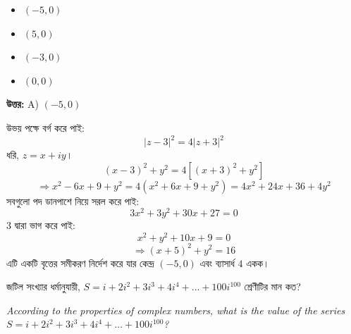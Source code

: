 \documentclass[12pt, a4paper]{article}
\begin{document}
\begin{itemize}[label={}, leftmargin=1cm, itemsep=0.5em]
    \item[\textbf{A)}] $(-5, 0)$
    \item[\textbf{B)}] $(5, 0)$
    \item[\textbf{C)}] $(-3, 0)$
    \item[\textbf{D)}] $(0, 0)$
\end{itemize}

\vspace{0.5em}
\begin{tcolorbox}[answerbox]
    \textbf{\color{success} উত্তর:} A) $(-5, 0)$
\end{tcolorbox}
\vspace{1em}

\begin{tcolorbox}[solutionbox={সমাধান (Solution)}]
    \noindent
    উভয় পক্ষে বর্গ করে পাই:
    \[ |z - 3|^2 = 4|z + 3|^2 \]
    ধরি, $z = x + iy$।
    \[ (x-3)^2 + y^2 = 4[(x+3)^2 + y^2] \]
    \[ \Rightarrow x^2 - 6x + 9 + y^2 = 4(x^2 + 6x + 9 + y^2) = 4x^2 + 24x + 36 + 4y^2 \]
    সবগুলো পদ ডানপাশে নিয়ে সরল করে পাই:
    \[ 3x^2 + 3y^2 + 30x + 27 = 0 \]
    $3$ দ্বারা ভাগ করে পাই:
    \[ x^2 + y^2 + 10x + 9 = 0 \]
    \[ \Rightarrow (x+5)^2 + y^2 = 16 \]
    এটি একটি বৃত্তের সমীকরণ নির্দেশ করে যার কেন্দ্র $(-5, 0)$ এবং ব্যাসার্ধ $4$ একক।
\end{tcolorbox}
\vspace{1em}

\begin{tcolorbox}[questionbox={প্রশ্ন (Question) 24}]
    \noindent
    জটিল সংখ্যার ধর্মানুযায়ী, $S = i + 2i^2 + 3i^3 + 4i^4 + \dots + 100i^{100}$ শ্রেণীটির মান কত?
    
    \vspace{0.8em}
    \begin{english}
    \noindent\textit{\color{darkgray}
    According to the properties of complex numbers, what is the value of the series $S = i + 2i^2 + 3i^3 + 4i^4 + \dots + 100i^{100}$?
    }
    \end{english}
\end{tcolorbox}
\end{document}
